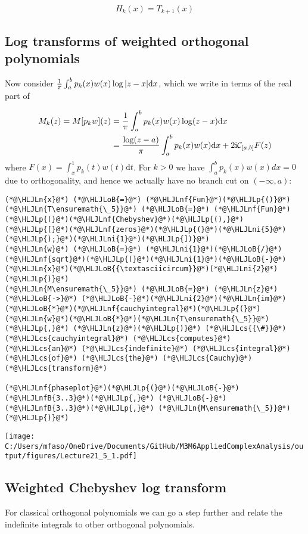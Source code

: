 \documentclass[12pt,a4paper]{article}
\newcommand{\HLJLn}[1]{#1}
\newcommand{\HLJLnf}[1]{\textcolor[RGB]{66,102,213}{#1}}
\newcommand{\HLJLnfB}[1]{\textcolor[RGB]{59,151,46}{#1}}
\newcommand{\HLJLni}[1]{\textcolor[RGB]{59,151,46}{#1}}
\newcommand{\HLJLoB}[1]{\textcolor[RGB]{102,102,102}{\textbf{#1}}}
\newcommand{\HLJLp}[1]{#1}
\newcommand{\HLJLcs}[1]{\textcolor[RGB]{153,153,119}{\textit{#1}}}
\def\D{ {\rm d} }
\def\I{ {\rm i} }
\def\CC{ {\cal C} }
\def\dx{\D x}
\begin{document}
\[
H_k(x) = T_{k+1}(x)
\]
\subsection{Log transforms of weighted orthogonal polynomials}
Now consider ${1 \over \pi} \int_a^b p_k(x) w(x) \log |z-x| \dx$, which we write in terms of the real part of


\begin{align*}
M_k(z) = M[p_k w](z)& = {1 \over \pi } \int_a^b p_k(x) w(x) \log (z-x) \dx \\
&= {\log(z-a) \over \pi}\int_{a}^{b}p_k(x) w(x)\mathrm{d}x + 2\I \CC_{[a,b]}F(z)
\end{align*}
where $F(x) = \int_{x}^{1} p_k(t) w(t) \mathrm{d}t$. For $k > 0$ we have $\int_a^b p_k(x) w(x) dx = 0$ due to orthogonality, and hence we actually have no branch cut on $(-\infty, a)$:


\begin{lstlisting}
(*@\HLJLn{x}@*) (*@\HLJLoB{=}@*) (*@\HLJLnf{Fun}@*)(*@\HLJLp{()}@*)
(*@\HLJLn{T\ensuremath{\_5}}@*) (*@\HLJLoB{=}@*) (*@\HLJLnf{Fun}@*)(*@\HLJLp{(}@*)(*@\HLJLnf{Chebyshev}@*)(*@\HLJLp{(),}@*) (*@\HLJLp{[}@*)(*@\HLJLnf{zeros}@*)(*@\HLJLp{(}@*)(*@\HLJLni{5}@*)(*@\HLJLp{);}@*)(*@\HLJLni{1}@*)(*@\HLJLp{])}@*)
(*@\HLJLn{w}@*) (*@\HLJLoB{=}@*) (*@\HLJLni{1}@*)(*@\HLJLoB{/}@*)(*@\HLJLnf{sqrt}@*)(*@\HLJLp{(}@*)(*@\HLJLni{1}@*)(*@\HLJLoB{-}@*)(*@\HLJLn{x}@*)(*@\HLJLoB{{\textasciicircum}}@*)(*@\HLJLni{2}@*)(*@\HLJLp{)}@*)
(*@\HLJLn{M\ensuremath{\_5}}@*) (*@\HLJLoB{=}@*) (*@\HLJLn{z}@*)(*@\HLJLoB{->}@*) (*@\HLJLoB{-}@*)(*@\HLJLni{2}@*)(*@\HLJLn{im}@*)(*@\HLJLoB{*}@*)(*@\HLJLnf{cauchyintegral}@*)(*@\HLJLp{(}@*)(*@\HLJLn{w}@*)(*@\HLJLoB{*}@*)(*@\HLJLn{T\ensuremath{\_5}}@*)(*@\HLJLp{,}@*) (*@\HLJLn{z}@*)(*@\HLJLp{)}@*) (*@\HLJLcs{{\#}}@*) (*@\HLJLcs{cauchyintegral}@*) (*@\HLJLcs{computes}@*) (*@\HLJLcs{an}@*) (*@\HLJLcs{indefinite}@*) (*@\HLJLcs{integral}@*) (*@\HLJLcs{of}@*) (*@\HLJLcs{the}@*) (*@\HLJLcs{Cauchy}@*) (*@\HLJLcs{transform}@*)

(*@\HLJLnf{phaseplot}@*)(*@\HLJLp{(}@*)(*@\HLJLoB{-}@*)(*@\HLJLnfB{3..3}@*)(*@\HLJLp{,}@*) (*@\HLJLoB{-}@*)(*@\HLJLnfB{3..3}@*)(*@\HLJLp{,}@*) (*@\HLJLn{M\ensuremath{\_5}}@*)(*@\HLJLp{)}@*)
\end{lstlisting}

\texttt{[image: C:/Users/mfaso/OneDrive/Documents/GitHub/M3M6AppliedComplexAnalysis/output/figures/Lecture21\_5\_1.pdf]}

\subsection{Weighted Chebyshev log transform}
For classical orthogonal polynomials we can go a step further and relate the indefinite integrals to other orthogonal polynomials.
\end{document}

